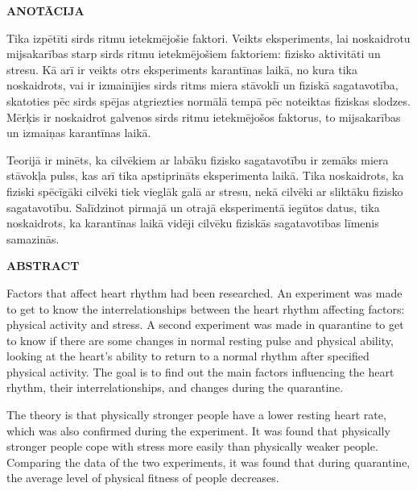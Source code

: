 \documentclass[12pt]{article}
\begin{document}
\begin{titlepage}
\begin{center}
    \fontsize{14}{}\selectfont\textbf{ANOTĀCIJA}
\end{center}

Tika izpētīti sirds ritmu ietekmējošie faktori. Veikts eksperiments, lai noskaidrotu mijsakarības starp sirds ritmu ietekmējošiem faktoriem: fizisko aktivitāti un stresu. Kā arī ir veikts otrs eksperiments karantīnas laikā, no kura tika noskaidrots, vai ir izmainījies sirds ritms miera stāvoklī un fiziskā sagatavotība, skatoties pēc sirds spējas atgriezties normālā tempā pēc noteiktas fiziskas slodzes. Mērķis ir noskaidrot galvenos sirds ritmu ietekmējošos faktorus, to mijsakarības un izmaiņas karantīnas laikā.\par
Teorijā ir minēts, ka cilvēkiem ar labāku fizisko sagatavotību ir zemāks miera stāvokļa pulss, kas arī tika apstiprināts eksperimenta laikā. Tika noskaidrots, ka fiziski spēcīgāki cilvēki tiek vieglāk galā ar stresu, nekā cilvēki ar sliktāku fizisko sagatavotību. Salīdzinot pirmajā un otrajā eksperimentā iegūtos datus, tika noskaidrots, ka karantīnas laikā vidēji cilvēku fiziskās sagatavotības līmenis samazinās. 

\vspace{4cm}

\begin{center}
    \fontsize{14}{}\selectfont\textbf{ABSTRACT}
\end{center}

Factors that affect heart rhythm had been researched. An experiment was made to get to know the interrelationships between the heart rhythm affecting factors: physical activity and stress. A second experiment was made in quarantine to get to know if there are some changes in normal resting pulse and physical ability, looking at the heart's ability to return to a normal rhythm after specified physical activity. The goal is to find out the main factors influencing the heart rhythm, their interrelationships, and changes during the quarantine.\par
The theory is that physically stronger people have a lower resting heart rate, which was also confirmed during the experiment. It was found that physically stronger people cope with stress more easily than physically weaker people. Comparing the data of the two experiments, it was found that during quarantine, the average level of physical fitness of people decreases.

\end{titlepage}
\end{document}
